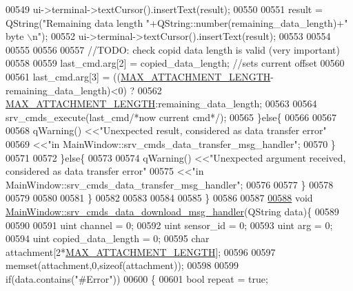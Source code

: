\begin{DoxyCode}
{{{{{{{{{{{{{{{{{{00549                    ui->terminal->textCursor().insertText(result);
00550 
00551                    result =  QString(\textcolor{stringliteral}{"Remaining data length "}+QString::number(remaining\_data\_length)+\textcolor{stringliteral}{" byte
      \(\backslash\)n"});
00552                    ui->terminal->textCursor().insertText(result);
00553 
00554 
00555 
00556 
00557                    \textcolor{comment}{//TODO: check copid data length is valid  (very important)}
00558 
00559                    last\_cmd.arg[2] = copied\_data\_length;  \textcolor{comment}{//sets current offset}
00560 
00561                    last\_cmd.arg[3] = ((\hyperlink{a00031_aa8abe3a822c64813f7aaba3ca7e3db9c}{MAX\_ATTACHMENT\_LENGTH}-remaining\_data\_length)<0)
      ?
00562                                           \hyperlink{a00031_aa8abe3a822c64813f7aaba3ca7e3db9c}{MAX\_ATTACHMENT\_LENGTH}:remaining\_data\_length;
00563 
00564                    srv\_cmds\_execute(last\_cmd\textcolor{comment}{/*now current cmd*/});
00565                \}\textcolor{keywordflow}{else}\{
00566 
00567 
00568                    qWarning() <<\textcolor{stringliteral}{"Unexpected result, considered as data transfer error"}
00569                               <<\textcolor{stringliteral}{"in MainWindow::srv\_cmds\_data\_transfer\_msg\_handler"};
00570                \}
00571 
00572            \}\textcolor{keywordflow}{else}\{
00573 
00574                qWarning() <<\textcolor{stringliteral}{"Unexpected argument received, considered as data transfer error"}
00575                           <<\textcolor{stringliteral}{"in MainWindow::srv\_cmds\_data\_transfer\_msg\_handler"};
00576 
00577            \}
00578 
00579 
00580 
00581          \}
00582 
00583 
00584 
00585 \}
00586 
00587 
\hypertarget{a00049_source_l00588}{}\hyperlink{a00006_ac84167866950dd1eb9a29a5293546c1a}{00588} \textcolor{keywordtype}{void} \hyperlink{a00006_ac84167866950dd1eb9a29a5293546c1a}{MainWindow::srv\_cmds\_data\_download\_msg\_handler}(QString 
      data)\{
00589 
00590     
00591     uint  channel              = 0;
00592     uint  sensor\_id            = 0;
00593     uint  arg                  = 0;
00594     uint  copied\_data\_length   = 0;
00595     \textcolor{keywordtype}{char} attachment[2*\hyperlink{a00031_aa8abe3a822c64813f7aaba3ca7e3db9c}{MAX\_ATTACHMENT\_LENGTH}];
00596 
00597     memset(attachment,0,\textcolor{keyword}{sizeof}(attachment));
00598 
00599         \textcolor{keywordflow}{if}(data.contains(\textcolor{stringliteral}{"#Error"}))
00600         \{
00601              \textcolor{keywordtype}{bool} repeat = \textcolor{keyword}{true};
}}}}}}}}}}}}}}}}}}
\end{DoxyCode}

